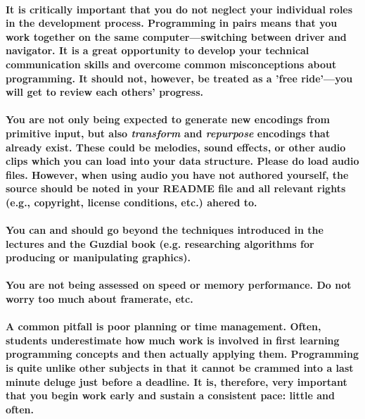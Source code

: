 \documentclass{../../fal_assignment}
\begin{document}
\paragraph{It is critically important that you do not neglect your individual roles in the development process. Programming in pairs means that you work together on the same computer---switching between driver and navigator. It is a great opportunity to develop your technical communication skills and overcome common misconceptions about programming. It should not, however, be treated as a 'free ride'---you will get to review each others' progress.}

\paragraph{You are not only being expected to generate new encodings from primitive input, but also \textit{transform} and \textit{repurpose} encodings that already exist. These could be melodies, sound effects, or other audio clips which you can load into your data structure. Please do load audio files. However, when using audio you have not authored yourself, the source should be noted in your README file and all relevant rights (e.g., copyright, license conditions, etc.) ahered to.}

\paragraph{You can and should go beyond the techniques introduced in the lectures and the Guzdial book (e.g. researching algorithms for producing or manipulating graphics).}

\paragraph{You are not being assessed on speed or memory performance. Do not worry too much about framerate, etc.}

\paragraph{A common pitfall is poor planning or time management. Often, students underestimate how much work is involved in first learning programming concepts and then actually applying them. Programming is quite unlike other subjects in that it cannot be crammed into a last minute deluge just before a deadline. It is, therefore, very important that you begin work early and sustain a consistent pace: little and often.}
\end{document}
